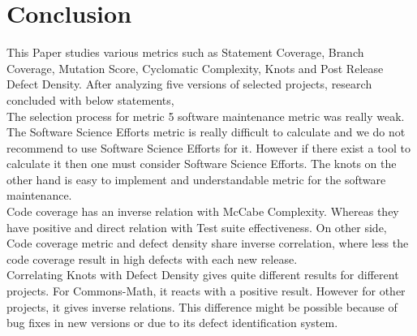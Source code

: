 \documentclass[letterpaper, 12 pt, conference]{ieeetran}  %
\begin{document}
\section{Conclusion}
This Paper studies various metrics such as Statement Coverage, Branch Coverage, Mutation Score, Cyclomatic Complexity, Knots and Post Release Defect Density. After analyzing five versions of selected projects, research concluded with below statements,
\\The selection process for metric 5 software maintenance metric was really weak. The Software Science Efforts metric is really difficult to calculate and we do not recommend to use Software Science Efforts for it. However if there exist a tool to calculate it then one must consider Software Science Efforts. The knots on the other hand is easy to implement and understandable metric for the software maintenance.
\\Code coverage has an inverse relation with McCabe Complexity. Whereas they have positive and direct relation with Test suite effectiveness. On other side, Code coverage metric and defect density share inverse correlation, where less the code coverage result in high defects with each new release.
\\Correlating Knots with Defect Density gives quite different results for different projects. For Commons-Math, it reacts with a positive result. However for other projects, it gives inverse relations. This difference might be possible because of bug fixes in new versions or due to its defect identification system.
\medskip



\balance




\clearpage
\end{document}
